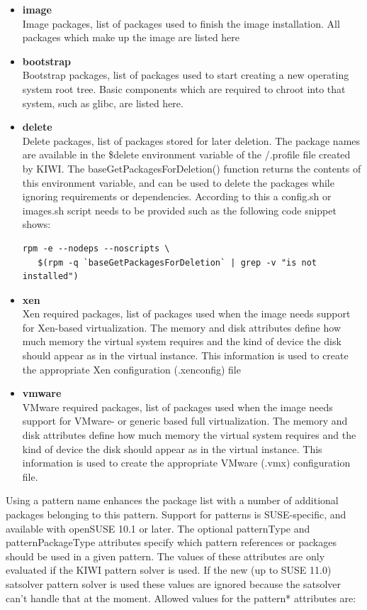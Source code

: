 \begin{itemize}
\item \textbf{image}\\
      Image packages, list of packages used to finish the image
      installation. All packages which make up the image are listed here
\item \textbf{bootstrap}\\
      Bootstrap packages, list of packages used to start creating a
      new operating system root tree. Basic components which are
      required to chroot into that system, such as glibc, are listed here.

\item \textbf{delete}\\
      Delete packages, list of packages stored for later deletion.
      The package names are available in the \$delete environment
      variable of the /.profile file created by KIWI. The 
      baseGetPackagesForDeletion() function returns the contents of this
      environment variable, and can be used to delete the packages
      while ignoring requirements or dependencies. According to this
      a config.sh or images.sh script needs to be provided such as
      the following code snippet shows:
\begin{verbatim}
rpm -e --nodeps --noscripts \
   $(rpm -q `baseGetPackagesForDeletion` | grep -v "is not installed")
\end{verbatim}
\item \textbf{xen}\\
      Xen required packages, list of packages used when the image
      needs support for Xen-based virtualization. The memory and disk
      attributes define how much memory the virtual system requires
      and the kind of device the disk should appear as in the virtual
      instance. This information is used to create the appropriate Xen
      configuration (.xenconfig) file
\item \textbf{vmware}\\
      VMware required packages, list of packages used when the image
      needs support for VMware- or generic based full virtualization. The
      memory and disk attributes define how much memory the virtual
      system requires and the kind of device the disk should appear
      as in the virtual instance. This information is used to create
      the appropriate VMware (.vmx) configuration file.
\end{itemize}

Using a pattern name enhances the package list with a number of
additional packages belonging to this pattern. Support for patterns
is SUSE-specific, and available with openSUSE 10.1 or later.
The optional patternType and patternPackageType attributes specify
which pattern references or packages should be used in a given pattern.
The values of these attributes are only evaluated if the KIWI pattern
solver is used. If the new (up to SUSE 11.0) satsolver pattern solver
is used these values are ignored because the satsolver can't handle
that at the moment. Allowed values for the pattern* attributes are:


